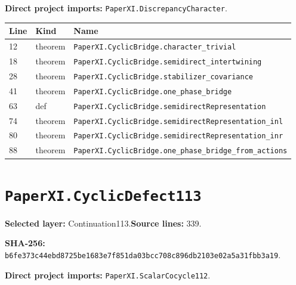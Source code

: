 \documentclass[10pt,oneside]{book}
\begin{document}
\textbf{Direct project imports:} \nolinkurl{PaperXI.DiscrepancyCharacter}.

\begin{longtable}{@{}p{}p{}p{}@{}}\toprule Line&Kind&Name\\\midrule\endhead

12&theorem&\nolinkurl{PaperXI.CyclicBridge.character_trivial}\\

18&theorem&\nolinkurl{PaperXI.CyclicBridge.semidirect_intertwining}\\

28&theorem&\nolinkurl{PaperXI.CyclicBridge.stabilizer_covariance}\\

41&theorem&\nolinkurl{PaperXI.CyclicBridge.one_phase_bridge}\\

63&def&\nolinkurl{PaperXI.CyclicBridge.semidirectRepresentation}\\

74&theorem&\nolinkurl{PaperXI.CyclicBridge.semidirectRepresentation_inl}\\

80&theorem&\nolinkurl{PaperXI.CyclicBridge.semidirectRepresentation_inr}\\

88&theorem&\nolinkurl{PaperXI.CyclicBridge.one_phase_bridge_from_actions}\\

\bottomrule\end{longtable}

\section{\texorpdfstring{\nolinkurl{PaperXI.CyclicDefect113}}{PaperXI.CyclicDefect113}}\label{module:PaperXI.CyclicDefect113}

\textbf{Selected layer:} Continuation113.\quad\textbf{Source lines:} 339.\par\textbf{SHA-256:} {\scriptsize\nolinkurl{b6fe373c44ebd8725be1683e7f851da03bcc708c896db2103e02a5a31fbb3a19}}.


\textbf{Direct project imports:} \nolinkurl{PaperXI.ScalarCocycle112}.
\end{document}
